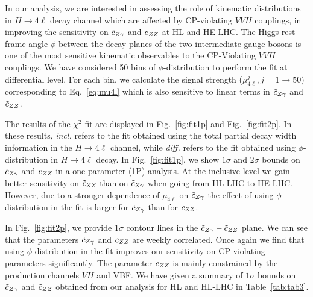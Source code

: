 {
In our analysis, we are interested in assessing the role of kinematic distributions in $H \to 4\ell$ decay channel 
which are affected by CP-violating $VVH$ couplings, in improving the sensitivity on $\tilde c_{Z\gamma}$ and $\tilde c_{ZZ}$ at HL and HE-LHC.
The Higgs rest frame angle $\phi$ between the decay planes of the two intermediate gauge bosons  
is one of the most sensitive kinematic observables to the CP-Violating $VVH$ couplings. We have considered 50 bins of $\phi$-distribution to perform the fit at differential level. For each bin, we calculate the signal strength ($\mu_{4\ell}^j, j=1\to50$) corresponding 
to Eq.~\ref{eq:mu4l} which is also sensitive to linear terms in $\tilde c_{Z\gamma}$ and $\tilde c_{ZZ}$.


The results of the $\chi^2$ fit are displayed in Fig.~\ref{fig:fit1p} and Fig.~\ref{fig:fit2p}. In these results, 
 {\it incl.} refers to the fit obtained using 
the total partial decay width information in the $H \to 4\ell$ channel, while {\it diff.} refers to the fit obtained using 
$\phi$-distribution in $H \to 4\ell$ decay. In Fig.~\ref{fig:fit1p}, we show 
$1\sigma$ and $2\sigma$ bounds on $\tilde c_{Z\gamma}$ and $\tilde c_{ZZ}$ in a one parameter (1P) 
analysis.  At the inclusive level 
we gain better sensitivity on $\tilde c_{ZZ}$ than on $\tilde c_{Z\gamma}$ when going from HL-LHC 
to HE-LHC. However, due to a stronger dependence of $\mu_{4\ell}$ on $\tilde c_{Z\gamma}$ the effect of using $\phi$-distribution in the fit is larger for $\tilde c_{Z\gamma}$ than for 
$\tilde c_{ZZ}$.

In Fig.~\ref{fig:fit2p}, we provide $1\sigma$ contour lines in the $\tilde c_{Z\gamma}-\tilde c_{ZZ}$ plane. We can see that the parameters $\tilde c_{Z\gamma}$ and $\tilde c_{ZZ}$ are weekly correlated. 
Once again we find that using $\phi$-distribution in the fit improves our 
sensitivity on CP-violating parameters significantly.
The parameter $\tilde c_{ZZ}$ is mainly constrained by the production channels $VH$ and VBF.
We have given a summary of $1\sigma$ bounds on $\tilde c_{Z\gamma}$ and $\tilde c_{ZZ}$ obtained from our analysis for HL and HL-LHC in Table~\ref{tab:tab3}.
}



